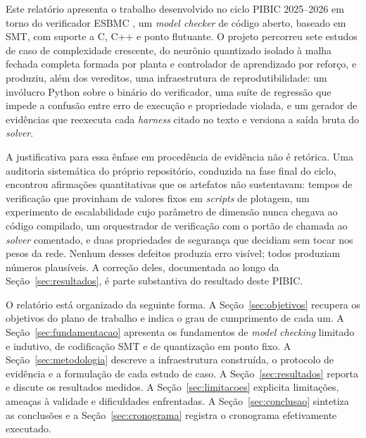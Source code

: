 Este relatório apresenta o trabalho desenvolvido no ciclo PIBIC 2025--2026 em torno do
verificador ESBMC \cite{gadelha2018esbmc}, um \textit{model checker} de código aberto,
baseado em SMT, com suporte a C, C++ e ponto flutuante. O projeto percorreu sete estudos de
caso de complexidade crescente, do neurônio quantizado isolado à malha fechada completa
formada por planta e controlador de aprendizado por reforço, e produziu, além dos vereditos,
uma infraestrutura de reprodutibilidade: um invólucro Python sobre o binário do verificador,
uma suíte de regressão que impede a confusão entre erro de execução e propriedade violada, e
um gerador de evidências que reexecuta cada \textit{harness} citado no texto e versiona a
saída bruta do \textit{solver}.

A justificativa para essa ênfase em procedência de evidência não é retórica. Uma auditoria
sistemática do próprio repositório, conduzida na fase final do ciclo, encontrou afirmações
quantitativas que os artefatos não sustentavam: tempos de verificação que provinham de
valores fixos em \textit{scripts} de plotagem, um experimento de escalabilidade cujo
parâmetro de dimensão nunca chegava ao código compilado, um orquestrador de verificação com
o portão de chamada ao \textit{solver} comentado, e duas propriedades de segurança que
decidiam sem tocar nos pesos da rede. Nenhum desses defeitos produzia erro visível; todos
produziam números plausíveis. A correção deles, documentada ao longo da
Seção~\ref{sec:resultados}, é parte substantiva do resultado deste PIBIC.

O relatório está organizado da seguinte forma. A Seção~\ref{sec:objetivos} recupera os
objetivos do plano de trabalho e indica o grau de cumprimento de cada um. A
Seção~\ref{sec:fundamentacao} apresenta os fundamentos de \textit{model checking} limitado e
indutivo, de codificação SMT e de quantização em ponto fixo. A Seção~\ref{sec:metodologia}
descreve a infraestrutura construída, o protocolo de evidência e a formulação de cada
estudo de caso. A Seção~\ref{sec:resultados} reporta e discute os resultados medidos. A
Seção~\ref{sec:limitacoes} explicita limitações, ameaças à validade e dificuldades
enfrentadas. A Seção~\ref{sec:conclusao} sintetiza as conclusões e a
Seção~\ref{sec:cronograma} registra o cronograma efetivamente executado.
